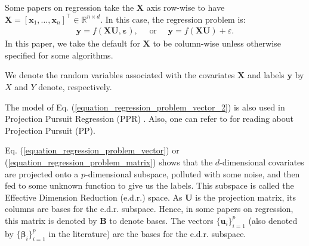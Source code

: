 \documentclass[lang=cn,10pt]{gorgeousnbook}
\numberwithin{equation}{section}%
\numberwithin{figure}{section}%
\begin{document}
\begin{remark}\label{remark_row_wise_regression}
Some papers on regression take the $\boldsymbol{X}$ axis row-wise to have $\boldsymbol{X} = [\boldsymbol{x}_1, \dots, \boldsymbol{x}_n]^\top \in \mathbb{R}^{n \times d}$. In this case, the regression problem is:
\begin{align}\label{equation_regression_problem_matrix_rowWise}
\boldsymbol{y} = f(\boldsymbol{X} \boldsymbol{U}, \boldsymbol{\varepsilon}), \quad \text{ or }\quad \boldsymbol{y} = f(\boldsymbol{X} \boldsymbol{U}) + \varepsilon.
\end{align}
In this paper, we take the default for $\boldsymbol{X}$ to be column-wise unless otherwise specified for some algorithms.
\end{remark}

We denote the random variables associated with the covariates $\boldsymbol{X}$ and labels $\boldsymbol{y}$ by $X$ and $Y$ denote, respectively. 

\begin{remark}
The model of Eq. (\ref{equation_regression_problem_vector_2}) is also used in Projection Pursuit Regression (PPR) \cite{friedman1981projection}. Also, one can refer to \cite{friedman1974projection} for reading about Projection Pursuit (PP).
\end{remark}

\begin{definition}\label{definition_edr_subspace}
Eq. (\ref{equation_regression_problem_vector}) or (\ref{equation_regression_problem_matrix}) shows that the $d$-dimensional covariates are projected onto a $p$-dimensional subspace, polluted with some noise, and then fed to some unknown function to give us the labels. This subspace is called the Effective Dimension Reduction (e.d.r.) space.
As $\boldsymbol{U}$ is the projection matrix, its columns are bases for the e.d.r. subspace. Hence, in some papers on regression, this matrix is denoted by $\boldsymbol{B}$ to denote bases. The vectors $\{\boldsymbol{u}_i\}_{i=1}^p$ (also denoted by $\{\boldsymbol{\beta}_i\}_{i=1}^p$ in the literature) are the bases for the e.d.r. subspace.
\end{definition}
\end{document}
